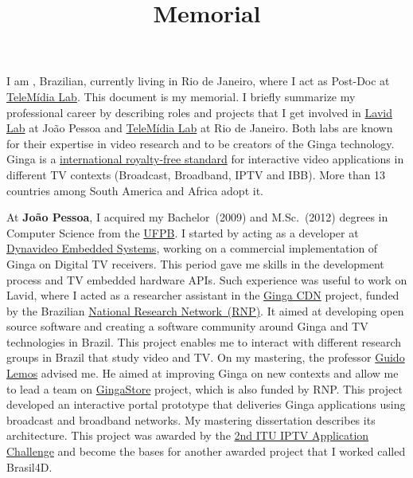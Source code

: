 \documentclass[10pt,a4paper,sans,colorlinks]{moderncv}
\title{Memorial}
\begin{document}
\hfHyperrefSetupBlueLinks
\makecvtitle

\setlength{\parindent}{15pt}
I am \myname, Brazilian, currently living in Rio de Janeiro, where I act as Post-Doc at \href{http://telemidia.puc-rio.br/}{TeleMídia Lab}.
This document is my memorial.
I briefly summarize my professional career by describing roles and projects that I get involved in \href{http://www.lavid.ufpb.br}{Lavid Lab} at João Pessoa and \href{http://telemidia.puc-rio.br/}{TeleMídia Lab} at Rio de Janeiro.
Both labs are known for their expertise in video research and to be creators of the Ginga technology.
Ginga is a \href{https://www.itu.int/rec/T-REC-H.761}{international royalty-free standard} for interactive video applications in different TV contexts (Broadcast, Broadband, IPTV and IBB).
More than 13 countries among South America and Africa adopt it.

At \textbf{João Pessoa}, I acquired my Bachelor~(2009) and M.Sc.~(2012) degrees in Computer Science from the \href{www.ufpb.br}{UFPB}.
I started by acting as a developer at \href{https://www.dynavideo.com.br}{Dynavideo Embedded Systems}, working on a commercial implementation of Ginga on Digital TV receivers.
This period gave me skills in the development process and TV embedded hardware APIs.
Such experience was useful to work on Lavid, where I acted as a researcher assistant in
the \href{http://www.redetic.rnp.br/ctic/2019/01/29/gingarap-gingafrevo/}{Ginga CDN}
project, funded by the Brazilian \href{https://www.rnp.br}{ National Research Network~(RNP)}.
It aimed at developing open source software and creating a software community around Ginga and TV technologies in Brazil.
This project enables me to interact with different research groups in Brazil that study video and TV.
On my mastering, the professor \href{https://www.linkedin.com/in/guido-lemos-5361a48/?originalSubdomain=br}{Guido Lemos} advised me.
He aimed at improving Ginga on new contexts and allow me to lead a team on \href{http://www.redetic.rnp.br/ctic/2019/01/29/ginga-appstore/}{GingaStore} project, which is also funded by RNP.
This project developed an interactive portal prototype that deliveries Ginga applications using broadcast and broadband networks.
My mastering dissertation describes its architecture.
This project was awarded by the \href{http://itu.int/en/ITU-T/challenges/pages/iptv.aspx}{2nd ITU IPTV Application Challenge} and become the bases for another awarded project that I worked called Brasil4D.
\end{document}
